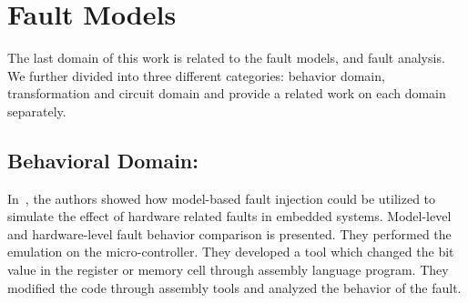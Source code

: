 


\section{Fault Models}


The last domain of this work is related to the fault models, and fault analysis. We further divided into three different categories: behavior domain, transformation and circuit domain and provide a related work on each domain separately.


\subsection{Behavioral Domain:}




In~\citep{svenningsson2010model}, the authors showed how model-based fault injection could be utilized to
simulate the effect of hardware related faults in embedded systems. Model-level and hardware-level
fault behavior comparison is presented. They performed the emulation on the micro-controller. They developed a tool which changed the bit value in the register or memory cell through assembly language program. They modified the code through assembly tools and analyzed the behavior of the fault.

